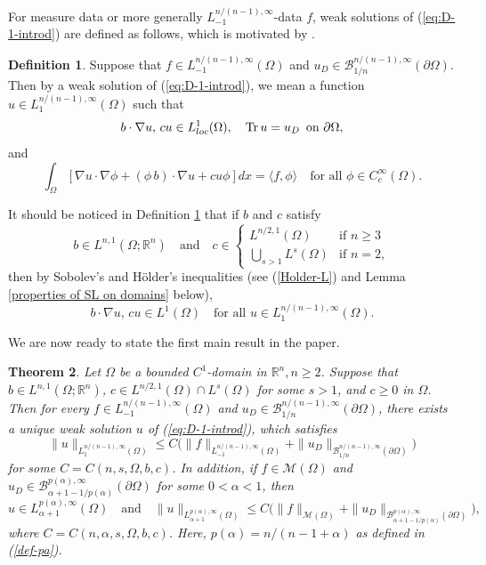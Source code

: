 \documentclass[reqno,centertags,11pt]{amsart}
\newtheorem{thm}{Theorem}
\theoremstyle{definition}
\newtheorem{dfn}[thm]{Definition}
\numberwithin{thm}{section}
\numberwithin{equation}{section}
\newcommand{\R}{{\mathbb{R}}}
\begin{document}
\medskip

For  measure data or more generally $L_{-1}^{n/(n-1),\infty}$-data $f$, weak solutions of (\ref{eq:D-1-introd}) are defined as follows, which is motivated by \cite{KO}.

\begin{dfn}\label{def-solutions-0}
   Suppose that  $f \in L_{-1}^{n/(n-1),\infty}(\Omega )$ and $u_D \in \mathcal B^{n/(n-1),\infty}_{1/n}(\partial \Omega )$.
Then by a   weak solution of (\ref{eq:D-1-introd}), we mean a function $u\in L_{1}^{n/(n-1),\infty}(\Omega )$   such that
\[
 b \cdot \nabla u, \, cu \in L_{loc}^1 (\Omega ) , \quad {\rm Tr}\, u = u_D \,\,\,\mbox{on}\,\,\partial\Omega ,
\]
and
\[
\int_\Omega \left[ \nabla u \cdot \nabla \phi + (  \phi\, b)  \cdot \nabla u +c u\phi \right]   dx =  \langle f ,  \phi \rangle
\quad\mbox{for all}\,\, \phi \in C_c^{\infty} (\Omega ).
\]
\end{dfn}


It should be noticed in Definition \ref{def-solutions-0}  that if $b$ and $c$ satisfy
$$
b \in L^{n,1}(\Omega ; \R^n ) \quad\mbox{and}\quad
 c \in
\begin{cases}
  L^{n/2,1}(\Omega )    & \mbox{if}\,\,n \ge 3 \\
 \bigcup_{s>1} L^s (\Omega ) & \mbox{if}\,\, n=2 ,
 \end{cases}
$$
then by Sobolev's and  H\"{o}lder's   inequalities (see  (\ref{Holder-L}) and Lemma \ref{properties of SL on domains}  below),
$$
b \cdot \nabla u, \, cu \in L^1 (\Omega ) \quad\mbox{for all}\,\, u\in L_{1}^{n/(n-1),\infty}(\Omega ) .
$$


\medskip

We are now ready to state  the first  main result  in the paper.

\begin{thm}\label{Poisson-L1 data}
Let $\Omega$ be a bounded $C^1$-domain in $\R^n , n \ge 2 $. Suppose that $b \in L^{n,1}(\Omega ; \R^n )$,    $ c \in L^{n/2,1}(\Omega )\cap L^s (\Omega )$ for some $s>1$, and $c \ge 0$ in $\Omega$.
Then for every   $f \in L_{-1}^{n/(n-1),\infty}(\Omega )$ and $u_D \in \mathcal B^{n/(n-1),\infty}_{1/n}(\partial \Omega )$, there exists a unique weak  solution  $u$  of (\ref{eq:D-1-introd}), which satisfies
\[
   \|   u \|_{L_{1}^{n/(n-1),\infty}(\Omega )}  \le C \Big( \|f \|_{L_{-1}^{n/(n-1),\infty}(\Omega )} + \|u_D \|_{\mathcal B^{n/(n-1),\infty}_{1/n}(\partial \Omega )} \Big)
\]
for some $C=C(n,  s, \Omega ,b,c )$. In addition, if $ f\in \mathcal{M}  (\Omega )$ and $u_D \in \mathcal B^{p(\alpha ),\infty}_{\alpha +1 -1/p (\alpha )}(\partial \Omega )$ for some  $0 <  \alpha <1$, then
\[
u \in L_{\alpha +1}^{p(\alpha) ,\infty}(\Omega  )  \quad\mbox{and}
\quad
 \|   u \|_{L_{\alpha +1}^{p(\alpha) ,\infty}(\Omega ) } \le C \Big( \|f \|_{\mathcal{M}  (\Omega )}+ \|u_D \|_{\mathcal B^{p(\alpha ),\infty}_{\alpha +1 -1/p (\alpha )}(\partial \Omega )} \Big),
\]
where   $C=C(n,\alpha ,    s, \Omega ,b,c )$. Here, $p(\alpha)=n/(n-1+\alpha)$ as defined in (\ref{def-pa}).
\end{thm}
\end{document}
